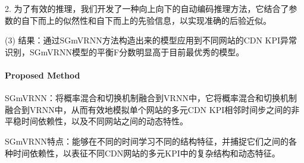 \documentclass[letterpaper,12pt]{article}
\begin{document}
		2. 为了有效的推理，我们开发了一种向上向下的自动编码推理方法，它结合了参数的自下而上的似然性和自下而上的先验信息，以实现准确的后验近似。
	
	(3) 结果：通过SGmVRNN方法构造出来的模型应用到不同网站的CDN KPI异常识别，SGmVRNN模型的平衡F分数明显高于目前最优秀的模型。
	
	\paragraph{Proposed Method}
	
	SGmVRNN：将概率混合和切换机制融合到VRNN中，它将概率混合和切换机制融合到VRNN中，从而有效地模拟单个网站的多元CDN KPI相邻时间步之间的非平稳时间依赖性，以及不同网站之间的动态特性。
		
		SGmVRNN特点：能够在不同的时间学习不同的结构特征，并捕捉它们之间的各种时间依赖性，以表征不同CDN网站的多元KPI中的复杂结构和动态特征。
		
\end{document}
